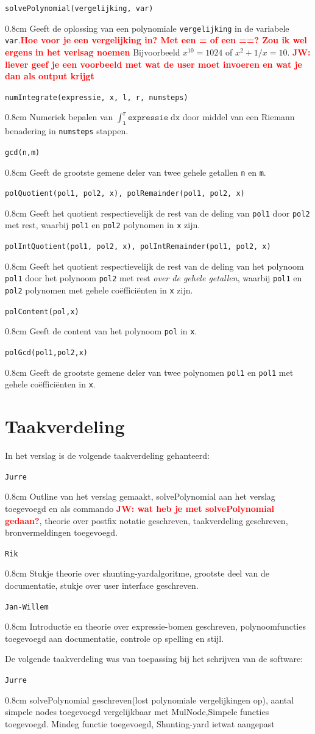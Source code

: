 \documentclass[a4paper]{article}
\newcommand{\rcom}[1]{\textbf{\textcolor{red}{#1}}}
\newcommand{\com}[2]{\texttt{#1}\mbox{}\vspace{-2ex}\begin{adjustwidth}{0.8cm}{} #2 \end{adjustwidth}}
\newcommand{\ttt}[1]{\texttt{#1}}
\begin{document}
\com{solvePolynomial(vergelijking, var)}{Geeft de oplossing van een polynomiale \ttt{vergelijking} in de variabele \ttt{var}.\rcom{Hoe voor je een vergelijking in? Met een = of een ==? Zou ik wel ergens in het verlsag noemen} Bijvoorbeeld $x^{10} = 1024$ of $x^2 + 1/x = 10$. \rcom{JW: liever geef je een voorbeeld met wat de user moet invoeren en wat je dan als output krijgt} }
\com{numIntegrate(expressie, x, l, r, numsteps)}{Numeriek bepalen van $\int_{\texttt{l}}^\texttt{r} \texttt{expressie} \; \mathrm{d}\texttt{x}$ door middel van een Riemann benadering in \texttt{numsteps} stappen.}
\com{gcd(n,m)}{Geeft de grootste gemene deler van twee gehele getallen \texttt{n} en \texttt{m}.}
\com{polQuotient(pol1, pol2, x), polRemainder(pol1, pol2, x)}{Geeft het quotient respectievelijk de rest van de deling van \texttt{pol1} door \texttt{pol2} met rest, waarbij \texttt{pol1} en \texttt{pol2} polynomen in \texttt{x} zijn.}
\com{polIntQuotient(pol1, pol2, x), polIntRemainder(pol1, pol2, x)}{Geeft het quotient respectievelijk de rest van de deling van het polynoom \texttt{pol1} door het polynoom \texttt{pol2} met rest \textit{over de gehele getallen}, waarbij \texttt{pol1} en \texttt{pol2} polynomen met gehele co\"effici\"enten in \texttt{x} zijn.}
\com{polContent(pol,x)}{Geeft de content van het polynoom \texttt{pol} in \texttt{x}.}
\com{polGcd(pol1,pol2,x)}{Geeft de grootste gemene deler van twee polynomen \texttt{pol1} en \texttt{pol1} met gehele co\"effici\"enten in \texttt{x}.}


\section{Taakverdeling}
In het verslag is de volgende taakverdeling gehanteerd:

\com{Jurre} {Outline van het verslag gemaakt, solvePolynomial aan het verslag toegevoegd en als commando \rcom{JW: wat heb je met solvePolynomial gedaan?}, theorie over postfix notatie geschreven, taakverdeling geschreven, bronvermeldingen toegevoegd.}

\com{Rik} {Stukje theorie over shunting-yardalgoritme, grootste deel van de documentatie, stukje over user interface geschreven.}
\com{Jan-Willem} {Introductie en theorie over expressie-bomen geschreven, polynoomfuncties toegevoegd aan documentatie, controle op spelling en stijl.}

De volgende taakverdeling was van toepassing bij het schrijven van de software:

\com{Jurre} {solvePolynomial geschreven(lost polynomiale vergelijkingen op), aantal simpele nodes toegevoegd vergelijkbaar met MulNode,Simpele functies toegevoegd. Mindeg functie toegevoegd, Shunting-yard ietwat aangepast}
\end{document}
